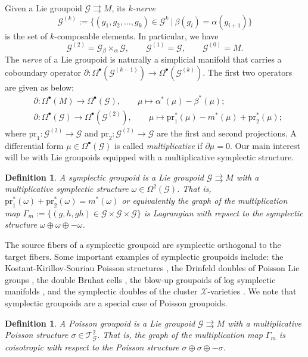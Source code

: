 \documentclass{amsart}
\newtheorem{definition}[theorem]{Definition}
\numberwithin{equation}{section}
\newcommand{\cG}{\mathcal{G}}
\newcommand{\cT}{\mathcal{T}}
\newcommand{\cX}{\mathcal{X}}
\newcommand{\rra}{\rightrightarrows}
\begin{document}
Given a Lie groupoid $\cG \rra M$, its \emph{$k$-nerve}
\[
	\cG^{(k)} := \{(g_1, g_2, \ldots, g_k) \in \cG^k ~|~ \beta(g_i) = \alpha(g_{i+1})\}
\]
is the set of $k$-composable elements.
In particular, we have
\[\cG^{(2)} = \cG {_\beta \times_\alpha} \cG,\qquad \cG^{(1)} = \cG,\qquad \cG^{(0)} = M.\]
The \emph{nerve} of a Lie groupoid is naturally a simplicial manifold that carries a coboundary operator $\partial: \Omega^\bullet(\cG^{(k-1)}) \to \Omega^\bullet(\cG^{(k)})$.
The first two operators are given as below:
\begin{align} 
  \label{eq:gpdcob}
  & \partial: \Omega^\bullet(M) \to \Omega^\bullet(\cG), \qquad \mu \mapsto \alpha^*(\mu) - \beta^*(\mu); \\
  & \partial: \Omega^\bullet(\cG) \to \Omega^\bullet(\cG^{(2)}), \qquad \mu \mapsto \mathrm{pr}_1^*(\mu) - m^*(\mu) + \mathrm{pr}_2^*(\mu);
\end{align}
where $\mathrm{pr}_1: \cG^{(2)} \to \cG$ and $\mathrm{pr}_2: \cG^{(2)} \to \cG$ are the first and second projections.
A differential form $\mu \in \Omega^\bullet(\cG)$ is called \emph{multiplicative} if $\partial \mu = 0$.
Our main interest will be with Lie groupoids equipped with a multiplicative symplectic structure.
\begin{definition}
  A \emph{symplectic groupoid} is a Lie groupoid $\cG \rra M$ with a multiplicative symplectic structure $\omega \in \Omega^2(\cG)$.
  That is, $\mathrm{pr}_1^*(\omega)+\mathrm{pr}_2^*(\omega) = m^*(\omega)$ or equivalently the graph of the multiplication map $\Gamma_m := \{(g, h, gh) \in \cG \times \cG \times \cG\}$ is Lagrangian with repsect to the symplectic structure $\omega \oplus \omega \oplus -\omega$.
\end{definition}

The source fibers of a symplectic groupoid are symplectic orthogonal to the target fibers.
Some important examples of symplectic groupoids include: the Kostant-Kirillov-Souriau Poisson structures \cite{MR996653}, the Drinfeld doubles of Poisson Lie groups \cite{MR1054741}, the double Bruhat cells \cite{LuM16}, the blow-up groupoids of log symplectic manifolds \cite{MR3214314}, and the symplectic doubles of the cluster $\cX$-varieties \cite{FG09c}.
We note that symplectic groupoids are a special case of Poisson groupoids.
\begin{definition}
  A \emph{Poisson groupoid} is a Lie groupoid $\cG \rra M$ with a multiplicative Poisson structure $\sigma \in \cT^2_\cG$.
  That is, the graph of the multiplication map $\Gamma_m$ is coisotropic with respect to the Poisson structure $\sigma \oplus \sigma \oplus -\sigma$.
\end{definition}
\end{document}
